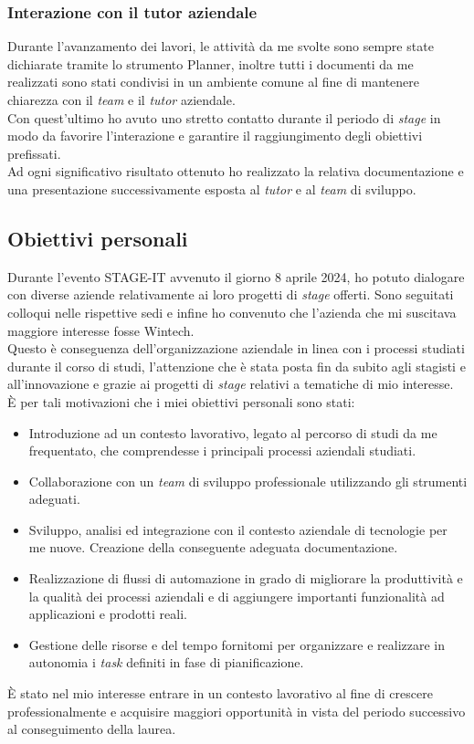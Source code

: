 \subsubsection*{Interazione con il tutor aziendale}
Durante l'avanzamento dei lavori, le attività da me svolte sono sempre state dichiarate tramite lo strumento Planner, inoltre tutti i documenti da me realizzati sono stati condivisi in un ambiente comune al fine di mantenere chiarezza con il \emph{team} e il \emph{tutor} aziendale.\\
Con quest'ultimo ho avuto uno stretto contatto durante il periodo di \emph{stage} in modo da favorire l'interazione e garantire il raggiungimento degli obiettivi prefissati.\\
Ad ogni significativo risultato ottenuto ho realizzato la relativa documentazione e una presentazione successivamente esposta al \emph{tutor} e al \emph{team} di sviluppo.\\

\subsection{Obiettivi personali}
Durante l'evento STAGE-IT avvenuto il giorno 8 aprile 2024, ho potuto dialogare con diverse aziende relativamente ai loro progetti di \emph{stage} offerti. Sono seguitati colloqui nelle rispettive sedi e infine ho convenuto che l'azienda che mi suscitava maggiore interesse fosse Wintech.\\
Questo è conseguenza dell'organizzazione aziendale in linea con i processi studiati durante il corso di studi, l'attenzione che è stata posta fin da subito agli stagisti e all'innovazione e grazie ai progetti di \emph{stage} relativi a tematiche di mio interesse.\\
È per tali motivazioni che i miei obiettivi personali sono stati:
\begin{itemize}
    \item Introduzione ad un contesto lavorativo, legato al percorso di studi da me frequentato, che comprendesse i principali processi aziendali studiati. 
    \item Collaborazione con un \emph{team} di sviluppo professionale utilizzando gli strumenti adeguati. 
    \item Sviluppo, analisi ed integrazione con il contesto aziendale di tecnologie per me nuove. Creazione della conseguente adeguata documentazione. 
    \item Realizzazione di flussi di automazione in grado di migliorare la produttività e la qualità dei processi aziendali e di aggiungere importanti funzionalità ad applicazioni e prodotti reali. 
    \item Gestione delle risorse e del tempo fornitomi per organizzare e realizzare in autonomia i \emph{task} definiti in fase di pianificazione.\\
\end{itemize}
È stato nel mio interesse entrare in un contesto lavorativo al fine di crescere professionalmente e acquisire maggiori opportunità in vista del periodo successivo al conseguimento della laurea. 
 
 
